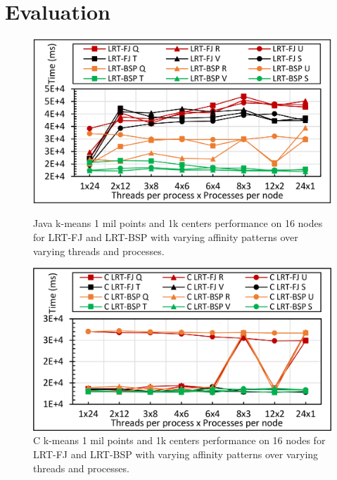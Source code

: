 \documentclass[10pt, conference, compsocconf]{IEEEtran}
\begin{document}



\section{Evaluation} \label{sec:evaluation}

\begin{figure}[!htb]
    \centering
    \begin{minipage}{.49\textwidth}
        \centering        
        \includegraphics[width=1\columnwidth]{images/fig_kmeans_1mil_1k_binding_patterns}
        \caption{Java k-means 1 mil points and 1k centers performance on 16 nodes for \ac{LRT-FJ} and \ac{LRT-BSP} with varying affinity patterns over varying threads and processes.}
        \label{fig:fig_kmeans_1mil_1k_binding_patterns}
    \end{minipage}
    \hspace{1.4mm}
    \begin{minipage}{0.49\textwidth}
        \centering
        \includegraphics[width=1\columnwidth]{images/fig_C_kmeans_1mil_1k_binding_patterns}
        \caption{C k-means 1 mil points and 1k centers performance on 16 nodes for \ac{LRT-FJ} and \ac{LRT-BSP} with varying affinity patterns over varying threads and processes.}
        \label{fig:fig_C_kmeans_1mil_1k_binding_patterns}
    \end{minipage}   
\end{figure}
\end{document}

